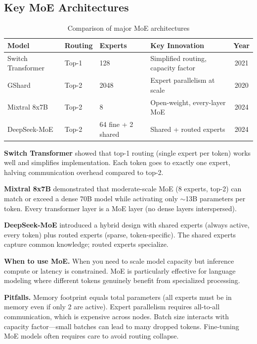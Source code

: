 \subsection{Key MoE Architectures}

\begin{table}[H]
\centering
\caption{Comparison of major MoE architectures}
\begin{tabularx}{\textwidth}{lXXXc}
\toprule
\textbf{Model} & \textbf{Routing} & \textbf{Experts} & \textbf{Key Innovation} & \textbf{Year} \\
\midrule
Switch Transformer & Top-1 & 128 & Simplified routing, capacity factor & 2021 \\
GShard & Top-2 & 2048 & Expert parallelism at scale & 2020 \\
Mixtral 8x7B & Top-2 & 8 & Open-weight, every-layer MoE & 2024 \\
DeepSeek-MoE & Top-2 & 64 fine + 2 shared & Shared + routed experts & 2024 \\
\bottomrule
\end{tabularx}
\end{table}

\textbf{Switch Transformer} showed that top-1 routing (single expert per token) works well and simplifies implementation. Each token goes to exactly one expert, halving communication overhead compared to top-2.

\textbf{Mixtral 8x7B} demonstrated that moderate-scale MoE (8 experts, top-2) can match or exceed a dense 70B model while activating only $\sim$13B parameters per token. Every transformer layer is a MoE layer (no dense layers interspersed).

\textbf{DeepSeek-MoE} introduced a hybrid design with shared experts (always active, every token) plus routed experts (sparse, token-specific). The shared experts capture common knowledge; routed experts specialize.

\textbf{When to use MoE.} When you need to scale model capacity but inference compute or latency is constrained. MoE is particularly effective for language modeling where different tokens genuinely benefit from specialized processing.

\textbf{Pitfalls.} Memory footprint equals total parameters (all experts must be in memory even if only 2 are active). Expert parallelism requires all-to-all communication, which is expensive across nodes. Batch size interacts with capacity factor---small batches can lead to many dropped tokens. Fine-tuning MoE models often requires care to avoid routing collapse.

